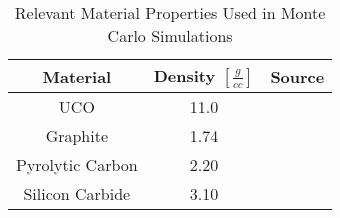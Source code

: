 \begin{table}[h!]
\centering
\caption{Relevant Material Properties Used in Monte Carlo Simulations}
\begin{tabular}{ c  c  c }
\hline
Material & Density $[\frac{g}{cc}]$ & Source \\
\hline
UCO & 11.0 & \cite{helmreich_year_2017, nagley_fabrication_2010}  \\
Graphite & 1.74 & \cite{ho_graphite_1988, johnson_properties_1976} \\
Pyrolytic Carbon & 2.20 & \cite{espi_metals_graphite-pyrolytic_2019} \\
Silicon Carbide & 3.10 & \cite{accuratus_silicon_2013} \\
\hline
\end{tabular}

\label{table:mat-params}
\end{table}